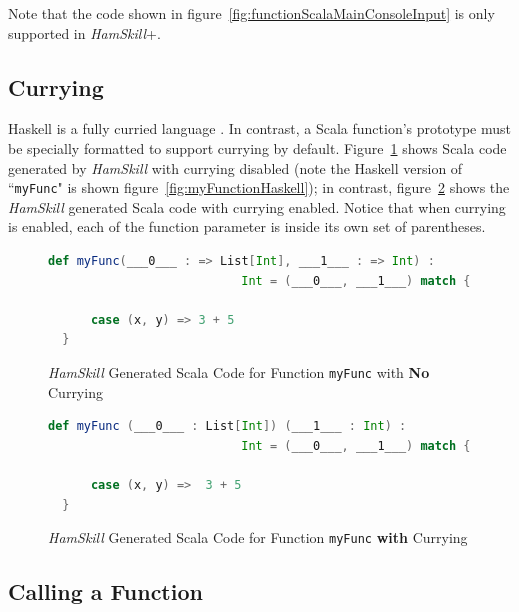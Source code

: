 \documentclass{report}
\begin{document}
Note that the code shown in figure~\ref{fig:functionScalaMainConsoleInput} is only supported in \textit{HamSkill}+.

\subsection{Currying}\label{sec:currying}

Haskell is a fully curried language \cite{learnYouAHaskell}.  In contrast, a Scala function's prototype must be specially formatted to support currying by default. Figure~\ref{fig:myFuncInScalaNoCurrying} shows Scala code generated by \textit{HamSkill} with currying disabled (note the Haskell version of ``\texttt{myFunc}" is shown figure~\ref{fig:myFunctionHaskell}); in contrast, figure~\ref{fig:myFuncInScalaWithCurrying} shows the \textit{HamSkill} generated Scala code with currying enabled.  Notice that when currying is enabled, each of the function parameter is inside its own set of parentheses.

\begin{figure}[H]
\begin{mdframed}
\begin{lstlisting}[basicstyle=\small, language=scala]
  def myFunc(___0___ : => List[Int], ___1___ : => Int) : 
                           Int = (___0___, ___1___) match {
      
      case (x, y) => 3 + 5
  } 
\end{lstlisting}
\end{mdframed}
\caption{\textit{HamSkill} Generated Scala Code for Function \texttt{myFunc} with \textbf{No} Currying}\label{fig:myFuncInScalaNoCurrying}
\end{figure}

\begin{figure}[H]
\begin{mdframed}
\begin{lstlisting}[basicstyle=\small, language=scala]
  def myFunc (___0___ : List[Int]) (___1___ : Int) :  
                           Int = (___0___, ___1___) match {
      
      case (x, y) =>  3 + 5
  }
\end{lstlisting}
\end{mdframed}
\caption{\textit{HamSkill} Generated Scala Code for Function \texttt{myFunc} \textbf{with} Currying}\label{fig:myFuncInScalaWithCurrying}
\end{figure}

\subsection{Calling a Function}\label{sec:callingAFunction}
\end{document}
